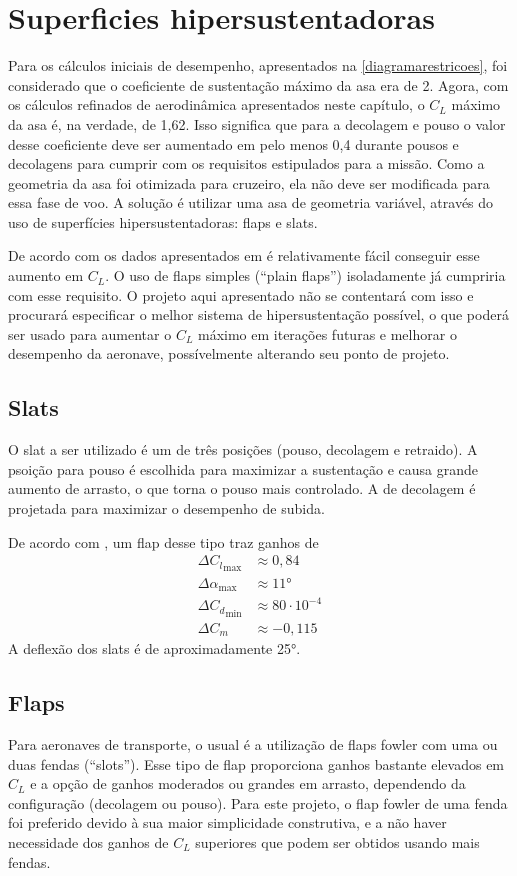 \section{Superficies hipersustentadoras}
Para os cálculos iniciais de desempenho, apresentados na \autoref{diagramarestricoes}, foi considerado que o coeficiente de sustentação máximo da asa era de 2. Agora, com os cálculos refinados de aerodinâmica apresentados neste capítulo, o $C_L$ máximo da asa é, na verdade, de 1,62. Isso significa que para a decolagem e pouso o valor desse coeficiente deve ser aumentado em pelo menos 0,4 durante pousos e decolagens para cumprir com os requisitos estipulados para a missão. Como a geometria da asa foi otimizada para cruzeiro, ela não deve ser modificada para essa fase de voo. A solução é utilizar uma asa de geometria variável, através do uso de superfícies hipersustentadoras: flaps e slats.

De acordo com os dados apresentados em \cite{gudmundsson} é relativamente fácil conseguir esse aumento em $C_L$. O uso de flaps simples (``plain flaps'')  isoladamente já cumpriria com esse requisito. O projeto aqui apresentado não se contentará com isso e procurará especificar o melhor sistema de hipersustentação possível, o que poderá ser usado para aumentar o $C_L$ máximo em iterações futuras e melhorar o desempenho da aeronave, possívelmente alterando seu ponto de projeto.

\subsection{Slats}
O slat a ser utilizado é um de três posições (pouso, decolagem e retraido). A
psoição para pouso é escolhida para maximizar a sustentação e causa grande
aumento de arrasto, o que torna o pouso mais controlado. A de decolagem é
projetada para maximizar o desempenho de subida.

De acordo com \cite{gudmundsson}, um flap desse tipo traz ganhos de
\begin{align}
    \Delta {C_l}_{\max} &\approx 0,84 \\
    \Delta {\alpha}_{\max} &\approx \ang{11} \\
    \Delta {C_d}_{\min} &\approx 80\cdot 10^{-4} \\
    \Delta {C_m} &\approx -0,115 
\end{align}
A deflexão dos slats é de aproximadamente \ang{25}.

\subsection{Flaps}
Para aeronaves de transporte, o usual é a utilização de flaps fowler com uma ou
duas fendas (``slots''). Esse tipo de flap proporciona ganhos bastante elevados
em $C_L$ e a opção de ganhos moderados ou grandes em arrasto, dependendo da
configuração (decolagem ou pouso). Para este projeto, o flap fowler de uma fenda
foi preferido devido à sua maior simplicidade construtiva, e a não haver
necessidade dos ganhos de $C_L$ superiores que podem ser obtidos usando mais
fendas.

